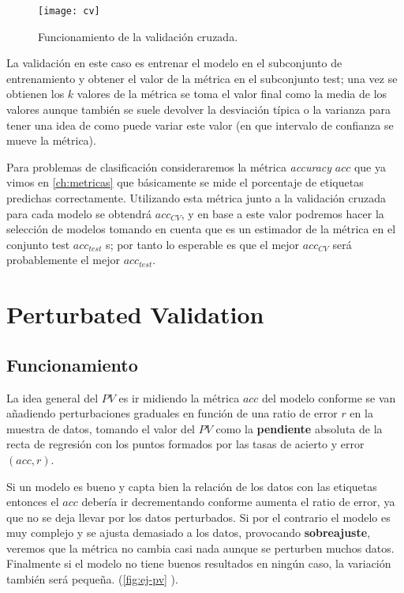 \begin{figure}[htbp]
  \centering
  \texttt{[image: cv]}
  \caption{Funcionamiento de la validación cruzada.}
  \label{fig:cv}
\end{figure}


La validación en este caso es entrenar el modelo en el subconjunto de entrenamiento y obtener el valor de la métrica en el subconjunto test; una vez se obtienen los $k$ valores de la métrica se toma el valor final como la media de los valores aunque también se suele devolver la desviación típica o la varianza para tener una idea de como puede variar este valor (en que intervalo de confianza se mueve la métrica).

Para problemas de clasificación consideraremos la métrica \emph{accuracy} $acc$ que ya vimos en \autoref{ch:metricas} que básicamente se mide el porcentaje de etiquetas predichas correctamente. Utilizando esta métrica junto a la validación cruzada para cada modelo se obtendrá $acc_{CV}$, y en base a este valor podremos hacer la selección de modelos tomando en cuenta que es un estimador de la métrica en el conjunto test $acc_{test}$ s; por tanto lo esperable es que el mejor $acc_{CV}$ será probablemente el mejor $acc_{test}$.

\section{Perturbated Validation}

\subsection{Funcionamiento}

La idea general del $PV$ es ir midiendo la métrica $acc$ del modelo conforme se van añadiendo perturbaciones graduales en función de una ratio de error $r$ en la muestra de datos, tomando el valor del $PV$ como la \textbf{pendiente} absoluta de la recta de regresión con los puntos formados por las tasas de acierto y error $(acc, r)$.

Si un modelo es bueno y capta bien la relación de los datos con las etiquetas entonces el $acc$ debería ir decrementando conforme aumenta el ratio de error, ya que no se deja llevar por los datos perturbados. Si por el contrario el modelo es muy complejo y se ajusta demasiado a los datos, provocando \textbf{sobreajuste}, veremos que la métrica no cambia casi nada aunque se perturben muchos datos. Finalmente si el modelo no tiene buenos resultados en ningún caso, la variación también será pequeña. (\autoref{fig:ej-pv} \cite{zhang2019perturbation}).

